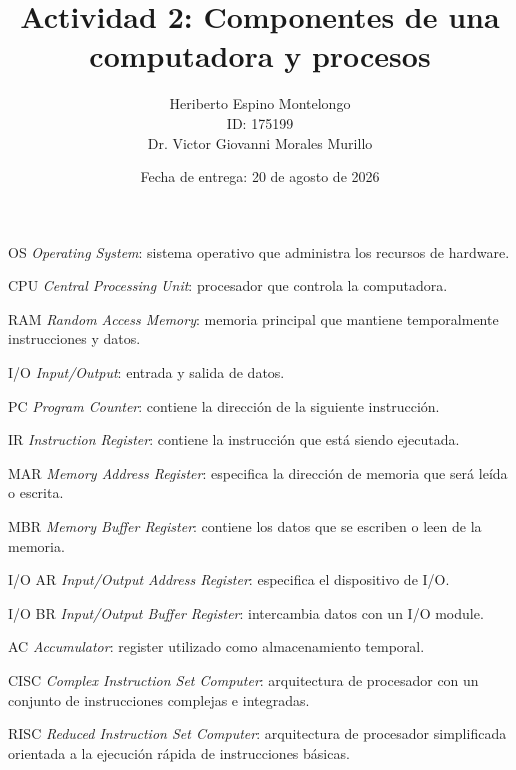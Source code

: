 \title{Actividad 2: Componentes de una computadora y procesos}
\author{Heriberto Espino Montelongo \\
  ID: 175199\\[1em]
   Dr. Victor Giovanni Morales Murillo}
\date{Fecha de entrega: 20 de agosto de 2026}
\subject{Análisis de los componentes de una computadora e implementación de procesos}

\frontmatter
\maketitle
\mainmatter
\listoffigures

\begin{abbreviations}
  \item[OS] \textit{Operating System}: sistema operativo que administra los recursos de hardware.
  \item[CPU] \textit{Central Processing Unit}: procesador que controla la computadora.
  \item[RAM] \textit{Random Access Memory}: memoria principal que mantiene temporalmente instrucciones y datos.
  \item[I/O] \textit{Input/Output}: entrada y salida de datos.
  \item[PC] \textit{Program Counter}: contiene la dirección de la siguiente instrucción.
  \item[IR] \textit{Instruction Register}: contiene la instrucción que está siendo ejecutada.
  \item[MAR] \textit{Memory Address Register}: especifica la dirección de memoria que será leída o escrita.
  \item[MBR] \textit{Memory Buffer Register}: contiene los datos que se escriben o leen de la memoria.
  \item[I/O AR] \textit{Input/Output Address Register}: especifica el dispositivo de I/O.
  \item[I/O BR] \textit{Input/Output Buffer Register}: intercambia datos con un I/O module.
  \item[AC] \textit{Accumulator}: register utilizado como almacenamiento temporal.
  \item[CISC] \textit{Complex Instruction Set Computer}: arquitectura de procesador con un conjunto de instrucciones complejas e integradas.
  \item[RISC] \textit{Reduced Instruction Set Computer}: arquitectura de procesador simplificada orientada a la ejecución rápida de instrucciones básicas.

\end{abbreviations}
